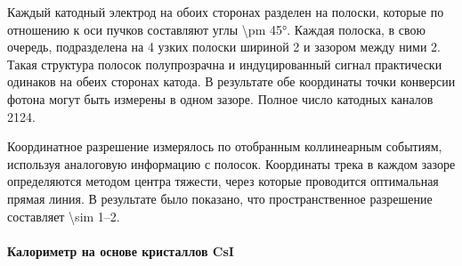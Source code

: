 Каждый катодный электрод на обоих сторонах разделен на полоски,
которые по отношению к оси пучков составляют углы \ang{\pm 45}. 
Каждая полоска, в свою очередь,
подразделена на 4 узких полоски шириной \SI{2}{\mmr} и зазором между ними \SI{2}{\mmr}. 
Такая структура полосок полупрозрачна и индуцированный сигнал практически одинаков на обеих сторонах катода. 
В результате обе координаты точки конверсии фотона могут быть измерены в одном зазоре.
Полное число катодных каналов \num{2124}.

Координатное разрешение измерялось по отобранным коллинеарным событиям,
используя аналоговую информацию с полосок. 
Координаты трека в каждом зазоре определяются методом центра тяжести,
через которые проводится оптимальная прямая
линия. 
В результате было показано,
что пространственное разрешение составляет \SIrange{\sim 1}{2}{\mmr}.



\paragraph{Калориметр на основе кристаллов CsI}\label{sec:csi}

